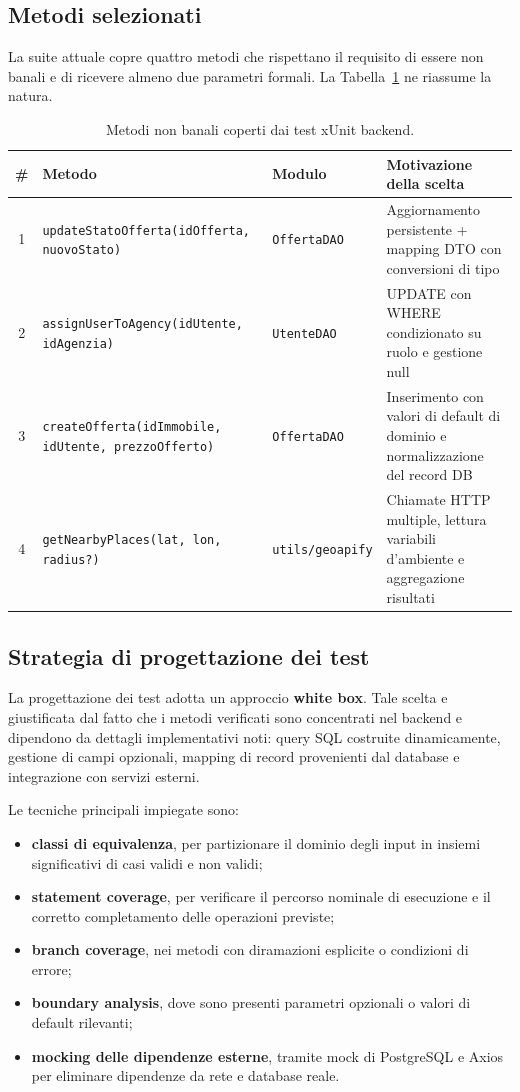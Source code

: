 \documentclass[a4paper,11pt]{article}
\begin{document}
\subsection{Metodi selezionati}
La suite attuale copre quattro metodi che rispettano il requisito di essere non banali e di ricevere almeno due parametri formali. La Tabella~\ref{tab:metodi} ne riassume la natura.

\begin{table}[H]
\centering
\begin{tabularx}{\textwidth}{@{}c l l X@{}}
\toprule
\# & Metodo & Modulo & Motivazione della scelta \\
\midrule
1 & \texttt{updateStatoOfferta(idOfferta, nuovoStato)} & \texttt{OffertaDAO} & Aggiornamento persistente + mapping DTO con conversioni di tipo \\
2 & \texttt{assignUserToAgency(idUtente, idAgenzia)} & \texttt{UtenteDAO} & UPDATE con WHERE condizionato su ruolo e gestione null \\
3 & \texttt{createOfferta(idImmobile, idUtente, prezzoOfferto)} & \texttt{OffertaDAO} & Inserimento con valori di default di dominio e normalizzazione del record DB \\
4 & \texttt{getNearbyPlaces(lat, lon, radius?)} & \texttt{utils/geoapify} & Chiamate HTTP multiple, lettura variabili d'ambiente e aggregazione risultati \\
\bottomrule
\end{tabularx}
\caption{Metodi non banali coperti dai test xUnit backend.}
\label{tab:metodi}
\end{table}

\subsection{Strategia di progettazione dei test}
La progettazione dei test adotta un approccio \textbf{white box}. Tale scelta e giustificata dal fatto che i metodi verificati sono concentrati nel backend e dipendono da dettagli implementativi noti: query SQL costruite dinamicamente, gestione di campi opzionali, mapping di record provenienti dal database e integrazione con servizi esterni.

Le tecniche principali impiegate sono:
\begin{itemize}
  \item \textbf{classi di equivalenza}, per partizionare il dominio degli input in insiemi significativi di casi validi e non validi;
  \item \textbf{statement coverage}, per verificare il percorso nominale di esecuzione e il corretto completamento delle operazioni previste;
  \item \textbf{branch coverage}, nei metodi con diramazioni esplicite o condizioni di errore;
  \item \textbf{boundary analysis}, dove sono presenti parametri opzionali o valori di default rilevanti;
  \item \textbf{mocking delle dipendenze esterne}, tramite mock di PostgreSQL e Axios per eliminare dipendenze da rete e database reale.
\end{itemize}
\end{document}
